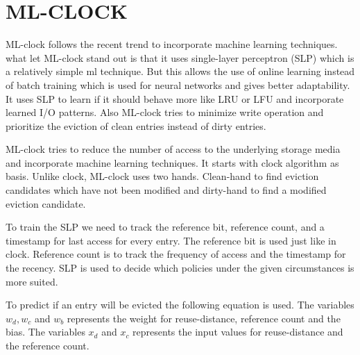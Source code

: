 \documentclass[
	12pt,
	a4paper,
	abstract,
	bibliography=totoc,
	chapterprefix,
	headings=openright,
	numbers=endperiod,
	parskip=half,
	twoside,
]{scrreprt}
\begin{document}
\section{ML-CLOCK}

ML-clock \cite{cho2021ml} follows the recent trend to incorporate machine learning techniques.
what let ML-clock stand out is that it uses single-layer perceptron (SLP) which is a relatively simple ml technique.
But this allows the use of online learning instead of batch training which is used for neural networks and gives better adaptability.
It uses SLP to learn if it should behave more like LRU or LFU and incorporate learned I/O patterns.
Also ML-clock tries to minimize write operation and prioritize the eviction of clean entries instead of dirty entries.

ML-clock tries to reduce the number of access to the underlying storage media and incorporate machine learning techniques.
It starts with clock algorithm as basis. 
Unlike clock, ML-clock uses two hands.
Clean-hand to find eviction candidates which have not been modified and dirty-hand to find a modified eviction candidate.

To train the SLP we need to track the reference bit, reference count, and a timestamp for last access for every entry.
The reference bit is used just like in clock.
Reference count is to track the frequency of access and the timestamp for the recency.
SLP is used to decide which policies under the given circumstances is more suited.

To predict if an entry will be evicted the following equation is used.
The variables $w_d, w_c$ and $w_b$ represents the weight for reuse-distance, reference count and the bias.
The variables $x_d$ and $x_c$ represents the input values for reuse-distance and the reference count.
\end{document}
